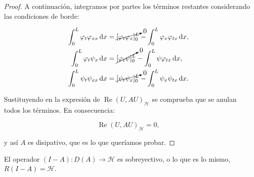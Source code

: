 \begin{proof}
    A continuación, integramos por partes los términos restantes considerando las condiciones de borde:

    \begin{align*}
        \int_0^L \varphi_t \varphi_{xx} \, \mathrm{d} x &= \cancelto{0}{[\varphi_t \varphi_x]_0^L} - \int_0^L \varphi_x \varphi_{tx} \, \mathrm{d} x,\\
        \int_0^L\varphi_t \psi_x \, \mathrm{d} x &= \cancelto{0}{[\varphi_t \psi]_0^L} - \int_0^L \psi \varphi_{tx} \, \mathrm{d} x,\\
        \int_0^L \psi_t \psi_{xx} \, \mathrm{d} x &= \cancelto{0}{[\psi_t \psi_x]_0^L} - \int_0^L \psi_x \psi_{tx} \, \mathrm{d} x.
    \end{align*}

    Sustituyendo en la expresión de $\operatorname{Re}(U,AU)_{\mathcal{H}}$ se comprueba que se anulan todos los términos. En consecuencia:

    \[\operatorname{Re}(U,AU)_{\mathcal{H}} = 0,\]

    y así $A$ es disipativo, que es lo que queríamos probar.
\end{proof}

\begin{Proposicion}
\label{ch:teoriaVigas:prop:ResolventeEsSobreyect}
    El operador $(I-A) : D(A) \rightarrow \mathcal{H}$ es sobreyectivo, o lo que es lo mismo, $R(I-A) = \mathcal{H}$.
\end{Proposicion}


